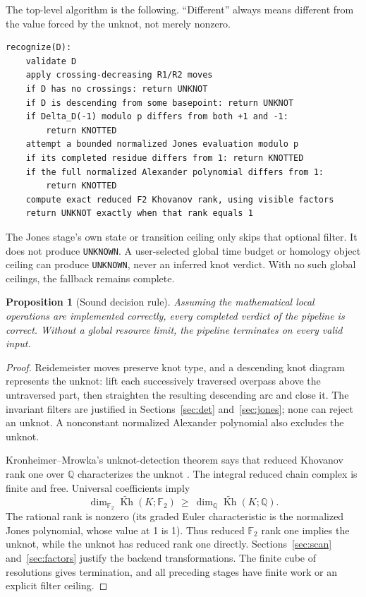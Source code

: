 \documentclass[11pt,letterpaper]{article}
\newtheorem{proposition}[theorem]{Proposition}
\theoremstyle{definition}
\newcommand{\F}{\mathbb F_2}
\newcommand{\rKh}{\widetilde{\operatorname{Kh}}}
\newcommand{\UNKNOWN}{\texttt{UNKNOWN}}
\begin{document}
The top-level algorithm is the following. ``Different'' always means different
from the value forced by the unknot, not merely nonzero.
\par\medskip\noindent\begin{minipage}{\linewidth}
\begin{lstlisting}
recognize(D):
    validate D
    apply crossing-decreasing R1/R2 moves
    if D has no crossings: return UNKNOT
    if D is descending from some basepoint: return UNKNOT
    if Delta_D(-1) modulo p differs from both +1 and -1:
        return KNOTTED
    attempt a bounded normalized Jones evaluation modulo p
    if its completed residue differs from 1: return KNOTTED
    if the full normalized Alexander polynomial differs from 1:
        return KNOTTED
    compute exact reduced F2 Khovanov rank, using visible factors
    return UNKNOT exactly when that rank equals 1
\end{lstlisting}
\end{minipage}\par\medskip

The Jones stage's own state or transition ceiling only skips that optional
filter. It does not produce \UNKNOWN. A user-selected global time budget or
homology object ceiling can produce \UNKNOWN, never an inferred knot verdict.
With no such global ceilings, the fallback remains complete.

\begin{proposition}[Sound decision rule]
Assuming the mathematical local operations are implemented correctly, every
completed verdict of the pipeline is correct. Without a global resource limit,
the pipeline terminates on every valid input.
\end{proposition}
\begin{proof}
Reidemeister moves preserve knot type, and a descending knot diagram represents
the unknot: lift each successively traversed overpass above the untraversed
part, then straighten the resulting descending arc and close it. The invariant
filters are justified in Sections~\ref{sec:det} and~\ref{sec:jones}; none can
reject an unknot. A nonconstant normalized Alexander polynomial also excludes
the unknot.

Kronheimer--Mrowka's unknot-detection theorem says that reduced Khovanov rank one
over $\mathbb Q$ characterizes the unknot \cite{km}. The integral reduced chain
complex is finite and free. Universal coefficients imply
\[
 \dim_{\F}\rKh(K;\F)\ \geq\ \dim_{\mathbb Q}\rKh(K;\mathbb Q).
\]
The rational rank is nonzero (its graded Euler characteristic is the normalized
Jones polynomial, whose value at 1 is 1). Thus reduced $\F$ rank one implies the
unknot, while the unknot has reduced rank one directly. Sections~\ref{sec:scan}
and~\ref{sec:factors} justify the backend transformations. The finite cube of
resolutions gives termination, and all preceding stages have finite work or an
explicit filter ceiling.
\end{proof}
\end{document}
